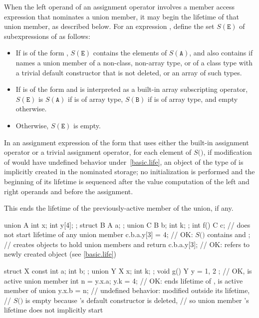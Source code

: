 \pnum
When the left operand of an assignment operator
involves a member access expression
that nominates a union member,
it may begin the lifetime of that union member,
as described below.
For an expression ,
define the set $S(\mathtt{E})$
of subexpressions of 
as follows:
\begin{itemize}
\item
If  is of the form ,
$S(\mathtt{E})$ contains the elements of $S(\mathtt{A})$,
and also contains 
if  names a union member of a non-class, non-array type,
or of a class type with a trivial default constructor that is not deleted,
or an array of such types.
\item
If  is of the form 
and is interpreted as a built-in array subscripting operator,
$S(\mathtt{E})$ is $S(\mathtt{A})$ if  is of array type,
$S(\mathtt{B})$ if  is of array type,
and empty otherwise.
\item
Otherwise, $S(\mathtt{E})$ is empty.
\end{itemize}
In an assignment expression of the form 
that uses either the built-in assignment operator
or a trivial assignment operator,
for each element  of $S($$)$,
if modification of  would have undefined behavior under~\ref{basic.life},
an object of the type of  is implicitly created
in the nominated storage;
no initialization is performed and
the beginning of its lifetime is sequenced after
the value computation of the left and right operands
and before the assignment.
\begin{note}
This ends the lifetime of the previously-active
member of the union, if any.
\end{note}
\begin{example}
\begin{codeblock}
union A { int x; int y[4]; };
struct B { A a; };
union C { B b; int k; };
int f() {
  C c;                  // does not start lifetime of any union member
  c.b.a.y[3] = 4;       // OK: $S($$)$ contains  and ;
                        // creates objects to hold union members  and 
  return c.b.a.y[3];    // OK:  refers to newly created object (see \ref{basic.life})
}

struct X { const int a; int b; };
union Y { X x; int k; };
void g() {
  Y y = { { 1, 2 } };   // OK,  is active union member
  int n = y.x.a;
  y.k = 4;              // OK: ends lifetime of ,  is active member of union
  y.x.b = n;            // undefined behavior:  modified outside its lifetime,
                        // $S($$)$ is empty because 's default constructor is deleted,
                        // so union member 's lifetime does not implicitly start
}
\end{codeblock}
\end{example}

